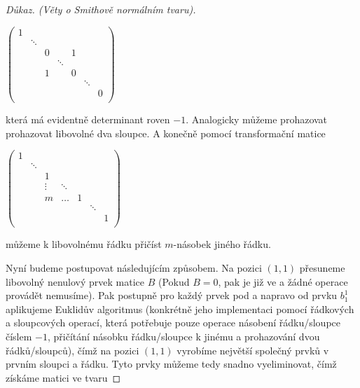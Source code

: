 \begin{proof}[Důkaz. (Věty o Smithově normálním tvaru)]
\begin{center}
$
    \begin{pmatrix}
        1       &        &        &        &        &        &        \\
                & \ddots &        &        &        &        &        \\
                &        & 0      &        & 1      &        &        \\
                &        &        & \ddots &        &        &        \\
                &        & 1      &        & 0      &        &        \\
                &        &        &        &        & \ddots &        \\
                &        &        &        &        &        & 0      \\
    \end{pmatrix}
$
\end{center}
která má evidentně determinant roven $ -1 $. Analogicky můžeme prohazovat
prohazovat libovolné dva sloupce. A konečně pomocí transformační matice
\begin{center}
$
    \begin{pmatrix}
        1       &        &        &        &        &        &        \\
                & \ddots &        &        &        &        &        \\
                &        & 1      &        &        &        &        \\
                &        & \vdots & \ddots &        &        &        \\
                &        & m      & \hdots & 1      &        &        \\
                &        &        &        &        & \ddots &        \\
                &        &        &        &        &        & 1      \\
    \end{pmatrix}
$
\end{center}
můžeme k libovolnému řádku přičíst $ m $-násobek jiného řádku.

Nyní budeme postupovat následujícím způsobem. Na pozici $ (1, 1) $ přesuneme libovolný
nenulový prvek matice $ B $ (Pokud $ B = 0 $, pak je již ve \snf a žádné operace
provádět nemusíme). Pak postupně pro každý prvek pod a napravo od prvku $ b_1^1 $
aplikujeme Euklidův algoritmus (konkrétně jeho implementaci pomocí řádkových a
sloupcových operací, která potřebuje pouze operace násobení řádku/sloupce číslem $ -1 $,
přičítání násobku řádku/sloupce k jinému a prohazování dvou řádků/sloupců),
čímž na pozici $ (1, 1) $ vyrobíme největší společný prvků
v prvním sloupci a řádku. Tyto prvky můžeme tedy snadno vyeliminovat, čímž získáme
matici ve tvaru


\end{proof}
